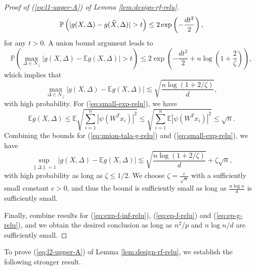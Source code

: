 \begin{proof}[Proof of (\ref{eq:l1-upper-A}) of Lemma \ref{lem:design-rf-relu}]
$$\mathbb{P}\left(|g(X,\Delta)-g(\wt{X},\Delta)|>t\right) \leq 2\exp\left(-\frac{dt^2}{2}\right),$$
for any $t>0$. A union bound argument leads to
$$\mathbb{P}\left(\max_{\Delta\in\mathcal{N}_{\zeta}}|g(X,\Delta) - \mathbb{E}g(X,\Delta)|>t\right)\leq 2\exp\left(-\frac{dt^2}{2}+n\log\left(1+\frac{2}{\zeta}\right)\right),$$
which implies that
$$\max_{\Delta\in\mathcal{N}_{\zeta}}|g(X,\Delta) - \mathbb{E}g(X,\Delta)|\lesssim \sqrt{\frac{n\log(1+2/\zeta)}{d}},$$
with high probability. For (\ref{eq:small-exp-relu}), we have
$$\mathbb{E}g(X,\Delta)\leq \mathbb{E}\sqrt{\sum_{i=1}^n|\psi(W^Tx_i)|^2}\leq \sqrt{\sum_{i=1}^n\mathbb{E}|\psi(W^Tx_i)|^2}\leq \sqrt{n}.$$
Combining the bounds for (\ref{eq:union-tala-g-relu}) and (\ref{eq:small-exp-relu}), we have
$$\sup_{\|\Delta\|=1}|g(X,\Delta) - \mathbb{E}g(X,\Delta)|\lesssim \sqrt{\frac{n\log(1+2/\zeta)}{d}} + \zeta\sqrt{n},$$
with high probability as long as $\zeta\leq 1/2$. We choose $\zeta=\frac{c}{\sqrt{n}}$ with a sufficiently small constant $c>0$, and thus the bound is sufficiently small as long as $\frac{n\log n}{d}$ is sufficiently small.

Finally, combine results for (\ref{eq:exp-f-inf-relu}), (\ref{eq:ep-f-relu}) and (\ref{eq:ep-g-relu}), and we obtain the desired conclusion as long as $n^2/p$ and $n\log n/d$ are sufficiently small.
\end{proof}

To prove (\ref{eq:l2-upper-A}) of Lemma \ref{lem:design-rf-relu}, we establish the following stronger result.

